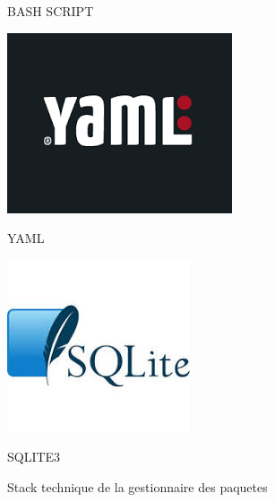\begin{figure}[hbt!]
\begin{minipage}[b]{0.18\textwidth}
    \caption{BASH SCRIPT}
  \end{minipage}\hfill
  \begin{minipage}[b]{0.18\textwidth}
    \includegraphics[width=\textwidth]{images_pfe/yml.png}
    \caption{YAML}
  \end{minipage}\hfill
  \begin{minipage}[b]{0.18\textwidth}
    \includegraphics[width=\textwidth]{images_pfe/sqlite.jpeg}
    \caption{SQLITE3}
  \end{minipage}\hfill
  
  \caption{Stack technique de la gestionnaire des paquetes}
  \label{fig:KPGlanguage}
\end{figure}
\FloatBarrier












